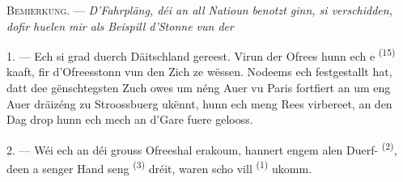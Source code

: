 %
%
%
%

\VUsaut{4.0mm}
\VUsaut{2.4mm}
\VUsaut{3.4mm}
\textsc{Bemierkung.} --- \textit{D'Fahrpläng, déi an all Natioun benotzt ginn, si
verschidden, dofir huelen mir als Beispill d'Stonne vun der} 

1. --- Ech si grad duerch Däitschland gereest. Virun der Ofrees hunn ech e
 \textsuperscript{(15)} kaaft, fir d'Ofreesstonn vun den Zich
ze wëssen. Nodeems ech festgestallt hat, datt dee gënschtegsten Zuch owes um néng
Auer vu Paris fortfiert an um eng Auer dräizéng zu Stroossbuerg ukënnt, hunn ech meng
Rees virbereet, an den Dag drop hunn ech mech an d'Gare fuere gelooss.

2. --- Wéi ech an déi grouss Ofreeshal erakoum, hannert engem alen Duerf-
\textsuperscript{(2)}, deen a senger Hand seng 
\textsuperscript{(3)} dréit, waren scho vill  \textsuperscript{(1)}
ukomm.

